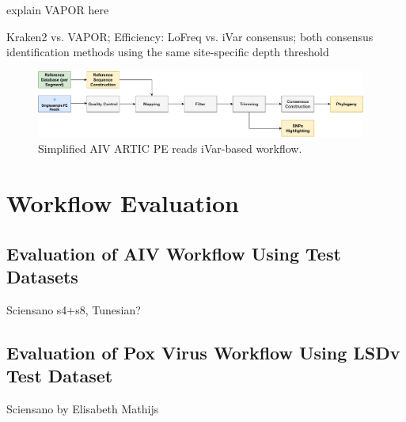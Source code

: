 explain VAPOR here

Kraken2 vs. VAPOR;
Efficiency: LoFreq vs. iVar consensus; both consensus identification methods using the same site-specific depth threshold

\begin{figure}
	\centering
	\includegraphics[width=0.97\textwidth]{media/3-pipelines-AIV.pdf}
	\caption{Simplified AIV ARTIC PE reads iVar-based workflow.}
	\label{fig:3-pipelines-aiv}
\end{figure}

\section{Workflow Evaluation}
\subsection{Evaluation of AIV Workflow Using Test Datasets}
 Sciensano s4+s8, Tunesian?

\subsection{Evaluation of Pox Virus Workflow Using LSDv Test Dataset}
 Sciensano by Elisabeth Mathijs
